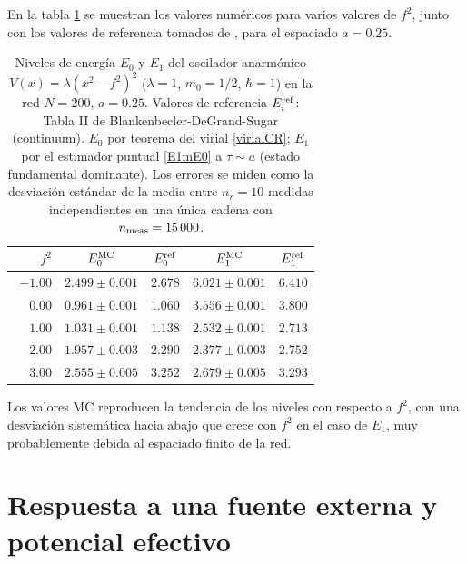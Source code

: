 \documentclass[11pt,a4paper,twoside,pdf]{article}
\numberwithin{equation}{section}
\begin{document}
En la tabla \ref{tab:niveles} se muestran los valores numéricos para varios valores de $f^2$, junto con los valores de referencia tomados de \cite{degrand1980numerical}, para el espaciado $a=0.25$.\medskip

\begin{table}[H]
    \centering
    \begin{tabular}{rcccc}
    \toprule
    $f^2$ & $E_0^{\rm MC}$ & $E_0^{\rm ref}$ & $E_1^{\rm MC}$ & $E_1^{\rm ref}$ \\
    \midrule
    $-1.00$ & $2.499 \pm 0.001$ & $2.678$ & $6.021 \pm 0.001$ & $6.410$ \\
    $\phantom{-}0.00$ & $0.961 \pm 0.001$ & $1.060$ & $3.556 \pm 0.001$ & $3.800$ \\
    $\phantom{-}1.00$ & $1.031 \pm 0.001$ & $1.138$ & $2.532 \pm 0.001$ & $2.713$ \\
    $\phantom{-}2.00$ & $1.957 \pm 0.003$ & $2.290$ & $2.377 \pm 0.003$ & $2.752$ \\
    $\phantom{-}3.00$ & $2.555 \pm 0.005$ & $3.252$ & $2.679 \pm 0.005$ & $3.293$ \\
    \bottomrule
    \end{tabular}
    \caption{Niveles de energía $E_0$ y $E_1$ del oscilador anarmónico $V(x) = \lambda(x^2-f^2)^2$ ($\lambda = 1$, $m_0 = 1/2$, $\hbar = 1$) en la red $N=200$, $a = 0.25$. Valores de referencia $E_i^{\rm ref}$: Tabla II de Blankenbecler-DeGrand-Sugar \cite{degrand1980numerical} (continuum). $E_0$ por teorema del virial \ref{virialCR}; $E_1$ por el estimador puntual \ref{E1mE0} a $\tau \sim a$ (estado fundamental dominante). Los errores se miden como la desviación estándar de la media entre $n_r = 10$ medidas independientes en una única cadena con $n_{\rm meas} = 15\,000$.}
    \label{tab:niveles}
\end{table}


Los valores MC reproducen la tendencia de los niveles con respecto a $f^2$, con una desviación sistemática hacia abajo que crece con $f^2$ en el caso de $E_1$, muy probablemente debida al espaciado finito de la red. 










\section{Respuesta a una fuente externa y potencial efectivo}
\end{document}
